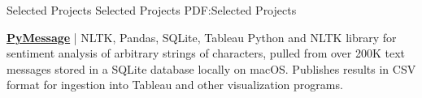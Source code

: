 \documentclass[letterpaper,MMMyyyy,nonstopmode]{simpleresumecv}
\begin{document}
\begin{Body}






\hrulefill
\Section
{Selected Projects}
{Selected Projects}
{PDF:Selected Projects}

\Entry
\href{https://github.com/miloszkowal/PyMessage}
{\textbf{PyMessage}} | NLTK, Pandas, SQLite, Tableau
\hfill
\Gap
Python and NLTK library for sentiment analysis of arbitrary strings of characters, pulled from over 200K text messages stored in a SQLite database locally on macOS. Publishes results in CSV format for ingestion into Tableau and other visualization programs.


\end{Body}
\end{document}
